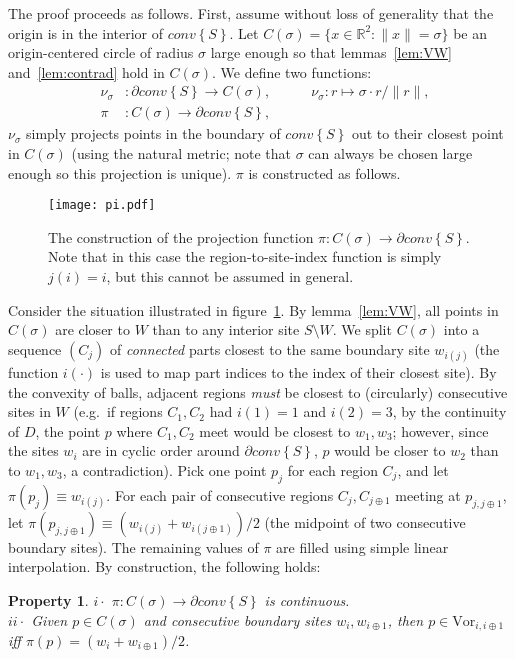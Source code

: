 \documentclass[11pt]{article}
\newtheorem{property}{Property}
\newcommand{\Sites}{S}
\newcommand{\Vor}{\text{Vor}}
\newcommand{\CHS}{{conv}\left\{\Sites\right\}}
\begin{document}
The proof proceeds as follows. First, assume without loss of generality  that the origin is in the interior of $\CHS$. 
Let  $C(\sigma)=\{x\in\mathbb{R}^2 : \|x\|=\sigma\}$ be an origin-centered circle 
	of radius $\sigma$ large enough so that lemmas~\ref{lem:VW} and~\ref{lem:contrad} hold in $C(\sigma)$. 
We define two  functions: 
\begin{eqnarray}\label{eq:pinu}
	&\nu_\sigma &: \partial\CHS\rightarrow C(\sigma), ~~~~~~~~~~~~~\nu_\sigma: r\mapsto \sigma \cdot r / \|r\|, \\
	&\pi &: C(\sigma)\rightarrow\partial\CHS,  \end{eqnarray}
$\nu_\sigma$  simply projects points in the boundary of $\CHS$ out to their closest point in $C(\sigma)$ 
(using the natural metric; note that $\sigma$ can always be chosen large enough so this projection is unique). 
$\pi$ is constructed as follows. 


\begin{figure}[htbp]
   \centering
   	\texttt{[image: pi.pdf]} \caption{The construction of the projection function $\pi:C(\sigma)\rightarrow \partial\CHS$. 
   Note that in this case the region-to-site-index function is simply $j(i)=i$, but this cannot be assumed in general. }
   \label{fig:pi}
\end{figure}

\thefoo\label{text:boundary}
Consider the situation illustrated in figure~\ref{fig:pi}. 
By lemma~\ref{lem:VW}, all points in $C(\sigma)$ are closer to $W$ than to any interior site $\Sites\setminus W$. 
We split $C(\sigma)$ into 
	a sequence $(C_j)$ of \emph{connected} parts closest 
	to the same boundary site $w_{i(j)}$ (the function $i(\cdot)$ is used to map part indices to the index of their closest site). 
By the convexity of balls, 
	adjacent regions \emph{must} be closest to (circularly) consecutive sites in $W$ 
	(e.g.~if regions $C_1,C_2$ had $i(1)=1$ and $i(2)=3$, 
	 by the continuity of $D$, the point $p$ where $C_1,C_2$ meet would be closest to $w_1,w_3$; 
	 however, since the sites $w_i$ are in cyclic order around $\partial\CHS$, 
$p$ would be closer to $w_2$ than to $w_1,w_3$, a contradiction). 
Pick one point $p_j$ for each region $C_j$, and let $\pi(p_j) \equiv w_{i(j)}$. 
For each pair of consecutive regions $C_j, C_{j\oplus 1}$ meeting at $p_{j,j\oplus 1}$, 
	let $\pi(p_{j,j\oplus 1}) \equiv (w_{i(j)} + w_{i(j\oplus 1)})/2$ (the midpoint of two consecutive boundary sites). 
The remaining values of $\pi$ are filled using simple linear interpolation. 
By construction, the following holds:
\begin{property}\label{prop:pi}
$i\cdot$ $\pi:C(\sigma)\rightarrow\partial\CHS$ is continuous. \\
\hspace*{0.91in}$ii\cdot$ Given $p\in C(\sigma)$ and consecutive boundary sites $w_i, w_{i\oplus 1}$, 
	then $p\in\Vor_{i, i\oplus 1}$ iff $\pi(p)=(w_i + w_{i\oplus 1})/2$. 
\end{property}
\end{document}
